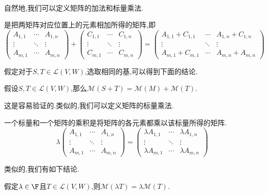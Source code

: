 \documentclass{ctexart}
\begin{document}
\\
自然地,我们可以定义矩阵的加法和标量乘法.
\begin{definition}[2.1 定义:矩阵的加法]
    是把两矩阵对应位置上的元素相加所得的矩阵,即
    $$\begin{pmatrix}
        A_{1,1} & \cdots & A_{1,n} \\
        \vdots & \ddots & \vdots \\
        A_{m,1} & \cdots & A_{m,n}
    \end{pmatrix}
    +
    \begin{pmatrix}
        C_{1,1} & \cdots & C_{1,n} \\
        \vdots & \ddots & \vdots \\
        C_{m,1} & \cdots & C_{m,n}
    \end{pmatrix}
    =
    \begin{pmatrix}
        A_{1,1}+C_{1,1} & \cdots & A_{1,n}+C_{1,n} \\
        \vdots          & \ddots & \vdots          \\
        A_{m,1}+C_{m,1} & \cdots & A_{m,n}+A_{m,n}
    \end{pmatrix}$$
\end{definition}\noindent
假定对于$S,T\in\mathcal{L}(V,W)$,选取相同的基,可以得到下面的结论.
\begin{formal}[2.2 线性映射之和的矩阵]
    假设$S,T\in\mathcal{L}(V,W)$,那么$\mathcal{M}(S+T)=\mathcal{M}(M)+\mathcal{M}(T)$.
\end{formal}\noindent
这是容易验证的.类似的,我们可以定义矩阵的标量乘法.
\begin{definition}[2.3 定义:矩阵的标量乘法]
    一个标量和一个矩阵的乘积是将矩阵的各元素都乘以该标量所得的矩阵.
    $$\lambda\begin{pmatrix}
        A_{1,1} & \cdots & A_{1,n} \\
        \vdots & \ddots & \vdots \\
        A_{m,1} & \cdots & A_{m,n}
    \end{pmatrix}
    =
    \begin{pmatrix}
        \lambda A_{1,1} & \cdots & \lambda A_{1,n} \\
        \vdots          & \ddots & \vdots          \\
        \lambda A_{m,1} & \cdots & \lambda A_{m,n}
    \end{pmatrix}$$
\end{definition}\noindent
类似的,我们有如下结论.
\begin{formal}[2.4 标量与线性映射之积的矩阵]
    假定$\lambda\in\F$且$T\in\mathcal{L}(V,W)$,则$\mathcal{M}(\lambda T)=\lambda\mathcal{M}(T)$.
\end{formal}\noindent
\end{document}
